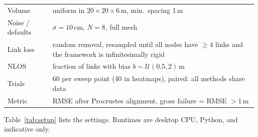 \documentclass[10pt,a4paper,twocolumn]{extarticle}
\begin{document}
\par\vspace{3pt}\noindent\begin{minipage}{\columnwidth}
\centering
{}
\label{tab:setup}
\footnotesize
\setlength{\tabcolsep}{3pt}
\begin{tabular}{@{}lP{6.0cm}@{}}
\toprule
Volume & uniform in $20\times20\times6$\,m, min.\ spacing 1\,m\\
Noise / defaults & $\sigma=10$\,cm, $N=8$, full mesh\\
Link loss & random removal, resampled until all nodes have $\ge4$ links and the framework is infinitesimally rigid\\
NLOS & fraction of links with bias $b\sim\mathcal{U}(0.5,2)$\,m\\
Trials & 60 per sweep point (40 in heatmaps), paired: all methods share data\\
Metric & RMSE after Procrustes alignment, gross failure = RMSE $>1$\,m\\
\bottomrule
\end{tabular}
\end{minipage}\par\vspace{3pt}

Table~\ref{tab:setup} lists the settings. Runtimes are desktop CPU, Python, and indicative only.
\end{document}
